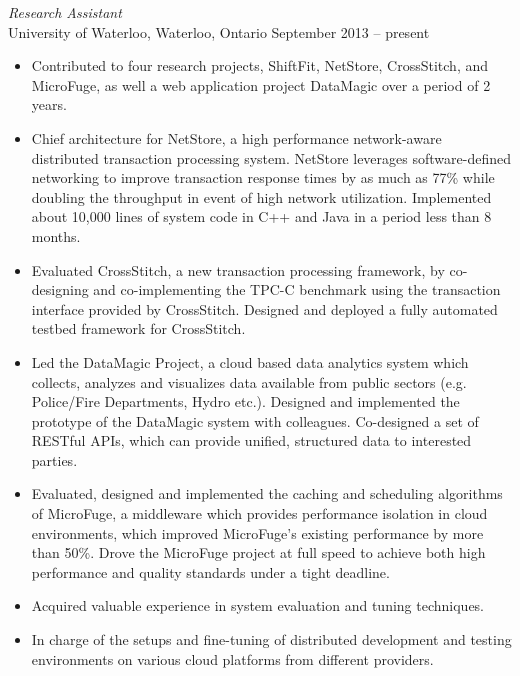 \documentclass[10pt]{res} %
\begin{document}
\begin{resume}
{\sl Research Assistant} \\
University of Waterloo, Waterloo, Ontario \hfill September 2013 -- present
\begin{itemize} \itemsep -2pt %
\item Contributed to four research projects, ShiftFit, NetStore, CrossStitch, and MicroFuge, as well a web application project DataMagic over a period of 2 years.
\item Chief architecture for NetStore, a high performance network-aware distributed transaction processing system. NetStore leverages software-defined networking to improve transaction response times by as much as 77\% while doubling the throughput in event of high network utilization. Implemented about 10,000 lines of system code in C++ and Java in a period less than 8 months.
\item Evaluated CrossStitch, a new transaction processing framework, by co-designing and co-implementing the TPC-C benchmark using the transaction interface provided by CrossStitch. Designed and deployed a fully automated testbed framework for CrossStitch.
\item Led the DataMagic Project, a cloud based data analytics system which collects, analyzes and visualizes data available from public sectors (e.g. Police/Fire Departments, Hydro etc.). Designed and implemented the prototype of the DataMagic system with colleagues. Co-designed a set of RESTful APIs, which can provide unified, structured data to interested parties.
\item Evaluated, designed and implemented the caching and scheduling algorithms of
  MicroFuge, a middleware which provides performance isolation in cloud environments, which improved MicroFuge’s existing performance by more than 50\%. Drove the MicroFuge project at full speed to achieve both high performance and quality standards under a tight deadline.
\item Acquired valuable experience in system evaluation and tuning techniques.
\item In charge of the setups and fine-tuning of distributed development and testing
  environments on various cloud platforms from different providers.
\end{itemize}

\vspace{-6pt} %


\end{resume}
\end{document}
